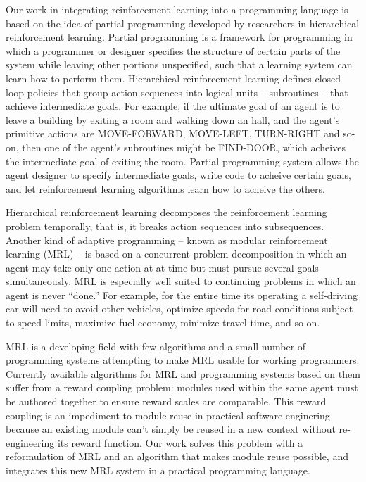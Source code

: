Our work in integrating reinforcement learning into a programming language is based on the idea of partial programming developed by researchers in hierarchical reinforcement learning. Partial programming is a framework for programming in which a programmer or designer specifies the structure of certain parts of the system while leaving other portions unspecified, such that a learning system can learn how to perform them. Hierarchical reinforcement learning defines closed-loop policies that group action sequences into logical units -- subroutines -- that achieve intermediate goals. For example, if the ultimate goal of an agent is to leave a building by exiting a room and walking down an hall, and the agent's primitive actions are MOVE-FORWARD, MOVE-LEFT, TURN-RIGHT and so-on, then one of the agent's subroutines might be FIND-DOOR, which acheives the intermediate goal of exiting the room. Partial programming system allows the agent designer to specify intermediate goals, write code to acheive certain goals, and let reinforcement learning algorithms learn how to acheive the others.

Hierarchical reinforcement learning decomposes the reinforcement learning problem temporally, that is, it breaks action sequences into subsequences. Another kind of adaptive programming -- known as modular reinforcement learning (MRL) -- is based on a concurrent problem decomposition in which an agent may take only one action at at time but must pursue several goals simultaneously. MRL is especially well suited to continuing problems in which an agent is never ``done.'' For example, for the entire time its operating a self-driving car will need to avoid other vehicles, optimize speeds for road conditions subject to speed limits, maximize fuel economy, minimize travel time, and so on.

MRL is a developing field with few algorithms and a small number of programming systems attempting to make MRL usable for working programmers. Currently available algorithms for MRL and programming systems based on them suffer from a reward coupling problem: modules used within the same agent must be authored together to ensure reward scales are comparable. This reward coupling is an impediment to module reuse in practical software enginering because an existing module can't simply be reused in a new context without re-engineering its reward function. Our work solves this problem with a reformulation of MRL and an algorithm that makes module reuse possible, and integrates this new MRL system in a practical programming language.


